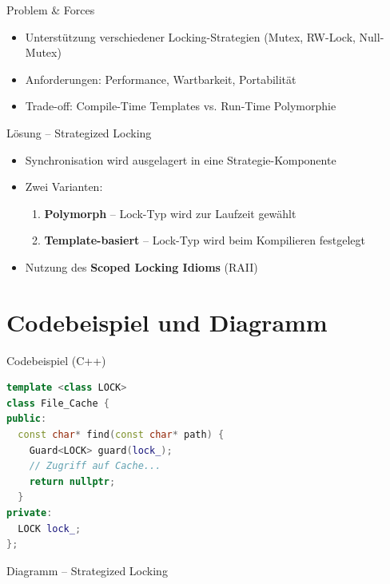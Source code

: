 \documentclass[aspectratio=169,10pt]{beamer}
\begin{document}
\begin{frame}{Problem \& Forces}
  \begin{itemize}
    \item Unterst\"utzung verschiedener Locking-Strategien (Mutex, RW-Lock, Null-Mutex)
    \item Anforderungen: Performance, Wartbarkeit, Portabilit\"at
    \item Trade-off: Compile-Time Templates vs. Run-Time Polymorphie
  \end{itemize}
\end{frame}

\begin{frame}{L\"osung -- Strategized Locking}
  \begin{itemize}
    \item Synchronisation wird ausgelagert in eine Strategie-Komponente
    \item Zwei Varianten:
      \begin{enumerate}
        \item \textbf{Polymorph} -- Lock-Typ wird zur Laufzeit gew\"ahlt
        \item \textbf{Template-basiert} -- Lock-Typ wird beim Kompilieren festgelegt
      \end{enumerate}
    \item Nutzung des \textbf{Scoped Locking Idioms} (RAII)
  \end{itemize}
\end{frame}

\section{Codebeispiel und Diagramm}
\begin{frame}[fragile]{Codebeispiel (C++)}
\begin{lstlisting}[language=C++]
template <class LOCK>
class File_Cache {
public:
  const char* find(const char* path) {
    Guard<LOCK> guard(lock_);
    // Zugriff auf Cache...
    return nullptr;
  }
private:
  LOCK lock_;
};
\end{lstlisting}
\end{frame}

\begin{frame}{Diagramm -- Strategized Locking}
  \begin{center}
  \end{center}
\end{frame}
\end{document}
